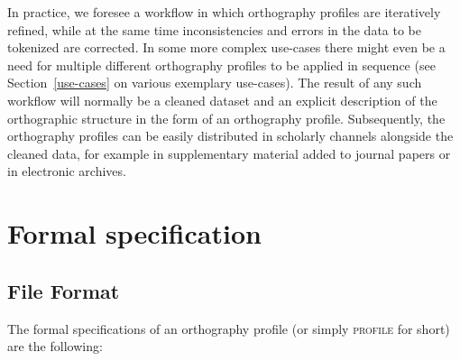 In practice, we foresee a workflow in which orthography profiles are iteratively
refined, while at the same time inconsistencies and errors in the data to be
tokenized are corrected. In some more complex use-cases there might even be a
need for multiple different orthography profiles to be applied in sequence (see
Section~\ref{use-cases} on various exemplary use-cases). The result of any such
workflow will normally be a cleaned dataset and an explicit description of the
orthographic structure in the form of an orthography profile. Subsequently, the
orthography profiles can be easily distributed in scholarly channels alongside
the cleaned data, for example in supplementary material added to journal papers
or in electronic archives.

\section{Formal specification}
\label{formal-specification-of-orthography-profiles}

\subsection*{File Format}
The formal specifications of an orthography profile (or simply \textsc{profile}
for short) are the following:

